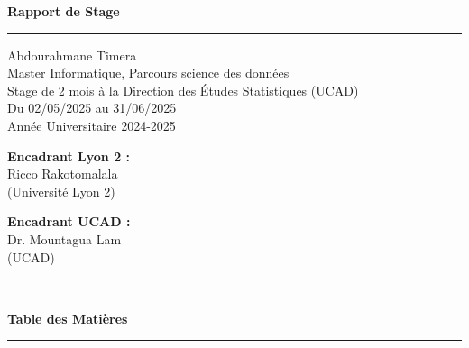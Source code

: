 \documentclass{article}
\begin{document}
\vspace{1.5cm} 

\begin{center}
    {\fontsize{38}{44}\selectfont\bfseries Rapport de Stage}\\[0.7em]
    \color{myblue}\rule{0.6\textwidth}{3pt}
\end{center}

\vspace{1cm}

\begin{center}
    {\fontsize{22}{26}\selectfont Abdourahmane Timera}\\[1.5em]
    {\fontsize{16}{20}\selectfont
        Master Informatique, Parcours science des données\\[0.5em]
        Stage de 2 mois à la Direction des Études Statistiques (UCAD)\\[0.5em]
        Du 02/05/2025 au 31/06/2025\\[0.5em]
        Année Universitaire 2024-2025\\[2em]
    }
\end{center}

\vspace{1cm}

\begin{tcolorbox}[colframe=myblue, colback=white, boxrule=0.8pt, arc=4pt, width=0.9\textwidth, left=0.5cm, right=0.5cm]
    \begin{minipage}{0.45\textwidth}
        \raggedright
        \textbf{Encadrant Lyon 2 :}\\
         Ricco Rakotomalala\\
        (Université Lyon 2)
    \end{minipage}
    \hfill
    \begin{minipage}{0.45 \textwidth}
        \raggedleft
        \textbf{Encadrant UCAD :}\\
        Dr. Mountagua Lam \\
        (UCAD)
    \end{minipage}
\end{tcolorbox}

\vfill

\newpage

\begin{center}
    \color{myblue}\rule{0.6\textwidth}{3pt}\\[1em]
    {\fontsize{18}{22}\selectfont\bfseries Table des Matières}\\[1em]
    \color{myblue}\rule{0.6\textwidth}{1pt}
\end{center}


\tableofcontents
\vspace{1cm}

\end{document}
